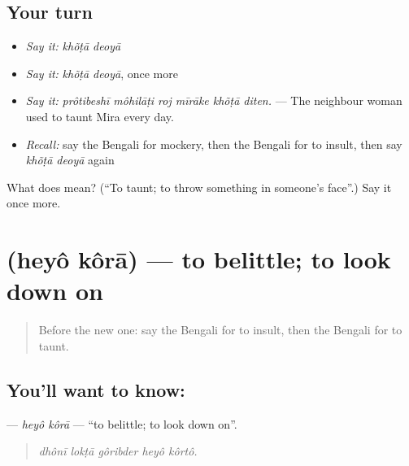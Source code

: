 \subsection*{Your turn}
\begin{itemize}
\raggedright
  \item \emph{Say it:} \emph{khõṭā deoyā}
  \item \emph{Say it:} \emph{khõṭā deoyā}, once more
  \item \emph{Say it:} \emph{prôtibeshī môhilāṭi roj mīrāke khõṭā diten.} — The neighbour woman used to taunt Mira every day.
  \item \emph{Recall:} say the Bengali for mockery, then the Bengali for to insult, then say \emph{khõṭā deoyā} again
\end{itemize}

\begin{tcolorbox}[breakable,colback=teal!4,colframe=teal!35!black,title={Before you move on}]
What does   mean? (\textquotedblleft{}To taunt; to throw something in someone's face\textquotedblright{}.) Say it once more.
\end{tcolorbox}
\section[\texorpdfstring{\bn{হেয়} \bn{করা} (heyô kôrā)}{হেয় করা (heyô kôrā)}]{  (heyô kôrā) — to belittle; to look down on}

\label{lesson:BN-C450-heyo-kora}



\begin{quote}
Before the new one: say the Bengali for to insult, then the Bengali for to taunt.
\end{quote}

\subsection*{You'll want to know:  }
\textbf{ } — \emph{heyô kôrā} — \textquotedblleft{}to belittle; to look down on\textquotedblright{}.

\begin{quote}
    
\end{quote}

\begin{quote}
\emph{dhônī lokṭā gôribder heyô kôrtô.}
\end{quote}

